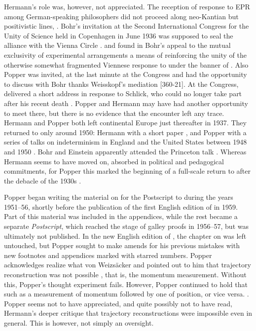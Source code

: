 \documentclass[final,12pt]{article}
\newcommand{\LdF}{\bt{Logik der Forschung}\xspace}
\newcommand{\Lo}{\bt{Logik}\xspace}
\newcommand{\TE}{thought experiment\xspace}
\newcommand{\Weis}{Weisskopf\xspace}
\newcommand{\vW}{von Weizsäcker\xspace}
\newcommand{\fnstar}[1]{\fn{\mbox{\textsuperscript{*}#1}}}
\begin{document}
Hermann's role was, however, not appreciated. The reception of  response to EPR among German-speaking philosophers did not proceed along neo-Kantian but positivistic lines, \citep{Blumberg1931-05}. Bohr's invitation at the Second International Congress for the Unity of Science held in Copenhagen in June 1936 was supposed to seal the alliance with the Vienna Circle \citep{Faye2010}.  and  found in Bohr’s  appeal to the mutual exclusivity of experimental arrangements  a means of reinforcing the unity of the otherwise somewhat fragmented Viennese response to \qm under the banner of  \citep{Beller1993}. Also Popper was invited, at the last minute at the Congress and had the opportunity to discuss with Bohr thanks \Weis{}'s mediation [360-21]. At the Congress, \citet{Hermann1936} delivered a short address in response to Schlick, who could no longer take part after his recent death \citep{Bacciagaluppi2020}. Popper and Hermann may have had another opportunity to meet there, but there is no evidence that the encounter left any trace. Hermann and Popper both left continental Europe just thereafter in 1937. They returned to \qm only around 1950: Hermann with a short paper \cite{Henry-Hermann1948}, and Popper with a series of talks on indeterminism in England and the United States between 1948 and 1950 \citep{Popper1951}. Bohr and Einstein apparently attended the Princeton talk \citep{Jammer1991}. Whereas Hermann seems to have moved on, absorbed in political and pedagogical commitments, for Popper this marked the beginning of a full-scale return to \qm after the debacle of the 1930s \citep{DelSanto2019}.


Popper began writing the material on \qm for the Postscript to \LdF during the years 1951--56, shortly before the publication of the first English edition of \Lo in 1959. Part of this material was included in the appendices, while the rest became a separate \textit{Postscript}, which reached the stage of galley proofs in 1956--57, but was ultimately not published. In the new English edition of \Lo, the chapter on \qm was left untouched, but Popper sought to make amends for his previous mistakes with new footnotes and appendices marked with starred numbers. Popper acknowledges realize what \vW and pointed out to him that trajectory reconstruction was not possible , that is, the momentum measurement. Without this, Popper's \TE fails. However, Popper continued to hold that  such as a measurement of momentum followed by one of position, or vice versa. \autocite[242\fnstar{3}\me]{Popper1959}. Popper seems not to have appreciated, and quite possibly not to have read, Hermann's deeper critique that trajectory reconstructions were impossible even in general. This is however, not simply an oversight. 
\end{document}
